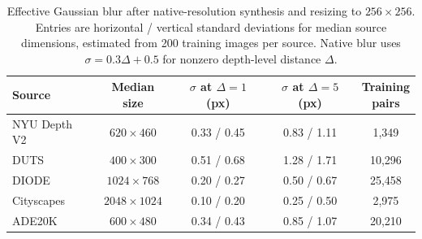 \begin{table}[htbp]
\centering
\small
\setlength{\tabcolsep}{4pt}
\caption{Effective Gaussian blur after native-resolution synthesis and resizing to $256\times256$. Entries are horizontal / vertical standard deviations for median source dimensions, estimated from 200 training images per source. Native blur uses $\sigma=0.3\Delta+0.5$ for nonzero depth-level distance $\Delta$.}
\label{tab:blurscale}
\begin{tabular}{lcccc}
\toprule
Source & Median size & $\sigma$ at $\Delta=1$ (px) & $\sigma$ at $\Delta=5$ (px) & \shortstack{Training\\pairs} \\
\midrule
NYU Depth V2 & $620\times460$ & 0.33 / 0.45 & 0.83 / 1.11 & 1{,}349 \\
DUTS & $400\times300$ & 0.51 / 0.68 & 1.28 / 1.71 & 10{,}296 \\
DIODE & $1024\times768$ & 0.20 / 0.27 & 0.50 / 0.67 & 25{,}458 \\
Cityscapes & $2048\times1024$ & 0.10 / 0.20 & 0.25 / 0.50 & 2{,}975 \\
ADE20K & $600\times480$ & 0.34 / 0.43 & 0.85 / 1.07 & 20{,}210 \\
\bottomrule
\end{tabular}
\end{table}
